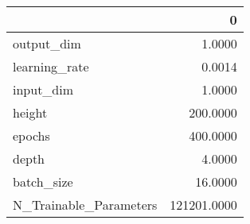 \begin{tabular}{lr}
\toprule
{} &            0 \\
\midrule
output\_dim             &       1.0000 \\
learning\_rate          &       0.0014 \\
input\_dim              &       1.0000 \\
height                 &     200.0000 \\
epochs                 &     400.0000 \\
depth                  &       4.0000 \\
batch\_size             &      16.0000 \\
N\_Trainable\_Parameters &  121201.0000 \\
\bottomrule
\end{tabular}

